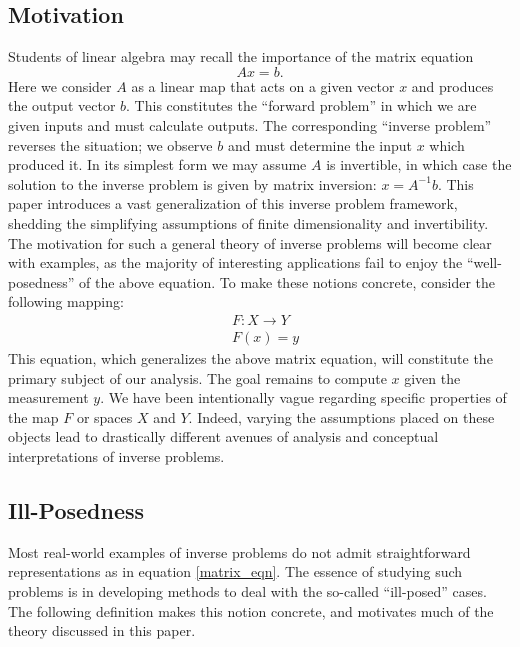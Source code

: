\documentclass[12pt]{article}
\begin{document}
\subsection{Motivation}
Students of linear algebra may recall the importance of the matrix equation
\begin{equation} 
Ax = b. \label{matrix_eqn}
\end{equation}  
Here we consider $A$ as a linear map 
that acts on a given vector $x$ and produces the output vector $b$. 
This constitutes the ``forward problem'' in which we are given inputs and must 
calculate outputs. The corresponding ``inverse problem'' reverses the situation; we observe 
$b$ and must determine the input $x$ which produced it. In its simplest form we may assume 
$A$ is invertible, in which case the solution to the inverse problem is given by matrix 
inversion: $x = A^{-1}b$. This paper introduces a vast generalization of this inverse 
problem framework, shedding the simplifying assumptions of finite dimensionality
and invertibility. The motivation for such a general theory 
of inverse problems will become clear with examples, as the majority of interesting 
applications fail to enjoy the ``well-posedness'' of the above equation. 
To make these notions concrete, consider the following mapping:
\begin{eqnarray} 
&F: X \to Y \nonumber \\
&F(x) = y \label{inverse_problem}
\end{eqnarray} 
This equation, which generalizes the above matrix equation, will constitute the primary subject 
of our analysis. The goal remains to compute $x$ given the measurement $y$. We have been intentionally 
vague regarding specific properties of the map $F$ or spaces $X$ and $Y$. Indeed, varying the assumptions 
placed on these objects lead to drastically different avenues of analysis and conceptual interpretations
of inverse problems. 

\subsection{Ill-Posedness}

Most real-world examples of inverse problems do not admit straightforward representations as in equation \eqref{matrix_eqn}.
The essence of studying such problems is in developing methods to 
deal with the so-called ``ill-posed'' cases. The following definition makes this notion concrete, 
and motivates much of the theory discussed in this paper. 
\end{document}
